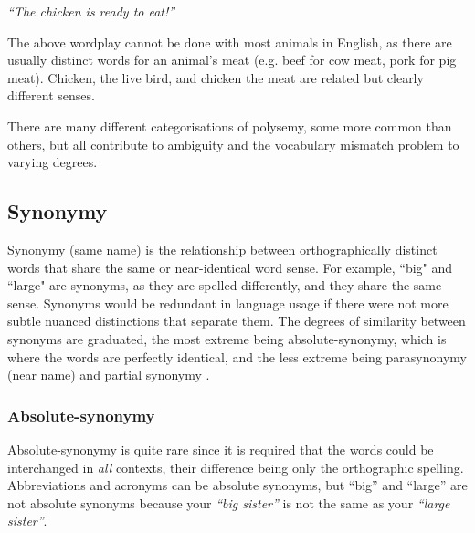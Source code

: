 \begin{center}
	\textit{``The chicken is ready to eat!''}
\end{center}

The above wordplay cannot be done with most animals in English, as there are usually distinct words for an animal's meat (e.g. beef for cow meat, pork for pig meat). Chicken, the live bird, and chicken the meat are related but clearly different senses. 

There are many different categorisations of polysemy, some more common than others, but all contribute to ambiguity and the vocabulary mismatch problem to varying degrees.


\subsection{Synonymy}
% 
Synonymy (same name) is the relationship between orthographically distinct words that share the same or near-identical word sense. For example, ``big" and ``large" are synonyms, as they are spelled differently, and they share the same sense. Synonyms would be redundant in language usage if there were not more subtle nuanced distinctions that separate them. The degrees of similarity between synonyms are graduated, the most extreme being absolute-synonymy, which is where the words are perfectly identical, and the less extreme being parasynonymy (near name) and partial synonymy \cite{cruse1986lexical}.

\subsubsection{Absolute-synonymy}
Absolute-synonymy is quite rare since it is required that the words could be interchanged in \textit{all} contexts, their difference being only the orthographic spelling. Abbreviations and acronyms can be absolute synonyms, but ``big'' and ``large'' are not absolute synonyms because your \textit{``big sister''} is not the same as your \textit{``large sister''}.



